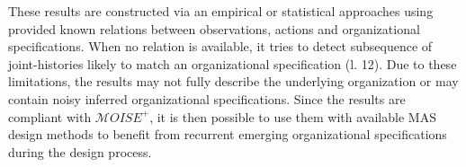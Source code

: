 \documentclass[runningheads]{llncs}
\newcounter{relation}
\begin{document}
These results are constructed via an empirical or statistical approaches using provided known relations between observations, actions and organizational specifications. When no relation is available, it tries to detect subsequence of joint-histories likely to match an organizational specification (l. 12). Due to these limitations, the results may not fully describe the underlying organization or may contain noisy inferred organizational specifications. Since the results are compliant with $\mathcal{M}OISE^+$, it is then possible to use them with available MAS design methods to benefit from recurrent emerging organizational specifications during the design process.








\end{document}
